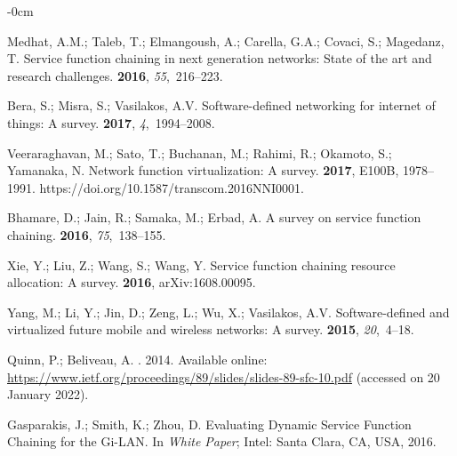 \documentclass[futureinternet,review,accept,pdftex,moreauthors]{Definitions/mdpi}
\begin{document}
\begin{adjustwidth}{-\extralength}{0cm}
\begin{thebibliography}{999}
Medhat, A.M.; Taleb, T.; Elmangoush, A.; Carella, G.A.; Covaci, S.; Magedanz,
  T.
\newblock Service function chaining in next generation networks: State of the
  art and research challenges.
 {\bf 2016}, {\em 55},~216--223.

Bera, S.; Misra, S.; Vasilakos, A.V.
\newblock Software-defined networking for internet of things: A survey.
 {\bf 2017}, {\em
  4},~1994--2008.

Veeraraghavan, M.; Sato, T.; Buchanan, M.; Rahimi, R.; Okamoto, S.; Yamanaka,
  N.
\newblock Network function virtualization: A survey.
 {\bf 2017},  E100B,
  1978--1991. {https://doi.org/10.1587/transcom.2016NNI0001.} %


Bhamare, D.; Jain, R.; Samaka, M.; Erbad, A.
\newblock A survey on service function chaining.
 {\bf 2016}, {\em
  75},~138--155.

Xie, Y.; Liu, Z.; Wang, S.; Wang, Y.
\newblock Service function chaining resource allocation: A survey.
 {\bf 2016},  arXiv:1608.00095.

Yang, M.; Li, Y.; Jin, D.; Zeng, L.; Wu, X.; Vasilakos, A.V.
\newblock Software-defined and virtualized future mobile and wireless networks:
  A survey.
 {\bf 2015}, {\em 20},~4--18.

Quinn, P.; Beliveau, A.
. {2014.}  Available online: \url{https://www.ietf.org/proceedings/89/slides/slides-89-sfc-10.pdf} (accessed on 20 January 2022).


Gasparakis, J.;  Smith, K.; Zhou, D.
\newblock Evaluating Dynamic Service Function Chaining for the Gi-LAN.
\newblock In {\em White Paper}; Intel: Santa Clara, CA, USA, 2016.


\end{thebibliography}
\end{adjustwidth}
\end{document}
